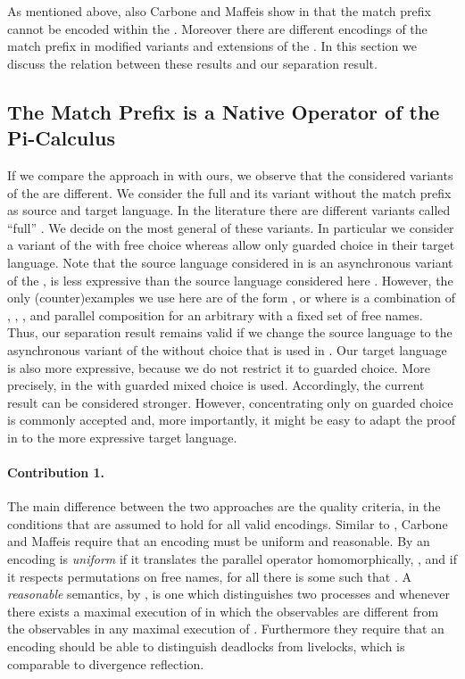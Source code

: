 \documentclass[final,copyright,creativecommons]{eptcs}
\begin{document}
As mentioned above, also Carbone and Maffeis show in \cite{carbone} that the match prefix cannot be encoded within the \piCal. Moreover there are different encodings of the match prefix in modified variants and extensions of the \piCal. In this section we discuss the relation between these results and our separation result.

\subsection{The Match Prefix is a Native Operator of the Pi-Calculus}
\label{sec:comparison}

If we compare the approach in \cite{carbone} with ours, we observe that the considered variants of the \piCal are different.
We consider the full \piCal and its variant without the match prefix as source and target language.
In the literature there are different variants called ``full'' \piCal. We decide on the most general of these variants. In particular we consider a variant of the \piCal with free choice whereas \cite{carbone} allow only guarded choice in their target language.
Note that the source language considered in \cite{carbone} is an asynchronous variant of the \piCal, \ie is less expressive than the source language considered here \cite{palamidessi03,petersNestmann14,petersNestmannGoltz13}.
However, the only (counter)examples we use here are of the form , or  where  is a combination of , , , and parallel composition for an arbitrary  with a fixed set of free names. Thus, our separation result remains valid if we change the source language to the asynchronous variant of the \piCal without choice that is used in \cite{carbone}.
Our target language is also more expressive, because we do not restrict it to guarded choice. More precisely, in \cite{carbone} the \piCal with guarded mixed choice is used. Accordingly, the current result can be considered stronger. However, concentrating only on guarded choice is commonly accepted and, more importantly, it might be easy to adapt the proof in \cite{carbone} to the more expressive target language.

\paragraph{Contribution 1.}
The main difference between the two approaches are the quality criteria, \ie in the conditions that are assumed to hold for all valid encodings.
Similar to \cite{palamidessi03}, Carbone and Maffeis require that an encoding must be uniform and reasonable.
By \cite{carbone} an encoding  is \emph{uniform} if it translates the parallel operator homomorphically, \ie , and if it respects permutations on free names, \ie for all  there is some  such that .
A \emph{reasonable} semantics, by \cite{carbone}, is one which distinguishes two processes  and  whenever there exists a maximal execution of  in which the observables are different from the observables in any maximal execution of .
Furthermore they require that an encoding should be able to distinguish deadlocks from livelocks, which is comparable to divergence reflection.
\end{document}
